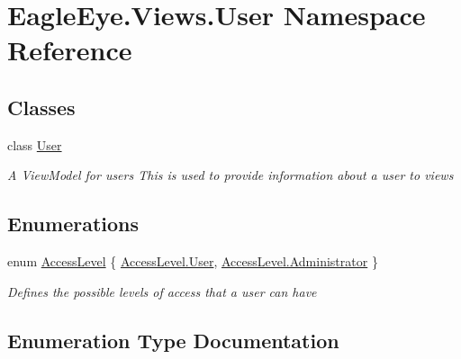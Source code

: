 \hypertarget{namespace_eagle_eye_1_1_views_1_1_user}{}\section{Eagle\+Eye.\+Views.\+User Namespace Reference}
\label{namespace_eagle_eye_1_1_views_1_1_user}
\subsection*{Classes}
\begin{DoxyCompactItemize}
\item 
class \mbox{\hyperlink{class_eagle_eye_1_1_views_1_1_user_1_1_user}{User}}
\begin{DoxyCompactList}\small\item\em A View\+Model for users This is used to provide information about a user to views \end{DoxyCompactList}\end{DoxyCompactItemize}
\subsection*{Enumerations}
\begin{DoxyCompactItemize}
\item 
enum \mbox{\hyperlink{namespace_eagle_eye_1_1_views_1_1_user_a5ec08150416703595770d50460878d89}{Access\+Level}} \{ \mbox{\hyperlink{namespace_eagle_eye_1_1_views_1_1_user_a5ec08150416703595770d50460878d89a8f9bfe9d1345237cb3b2b205864da075}{Access\+Level.\+User}}, 
\mbox{\hyperlink{namespace_eagle_eye_1_1_views_1_1_user_a5ec08150416703595770d50460878d89a7b7bc2512ee1fedcd76bdc68926d4f7b}{Access\+Level.\+Administrator}}
 \}
\begin{DoxyCompactList}\small\item\em Defines the possible levels of access that a user can have \end{DoxyCompactList}\end{DoxyCompactItemize}


\subsection{Enumeration Type Documentation}
\mbox{\label{namespace_eagle_eye_1_1_views_1_1_user_a5ec08150416703595770d50460878d89}} 
